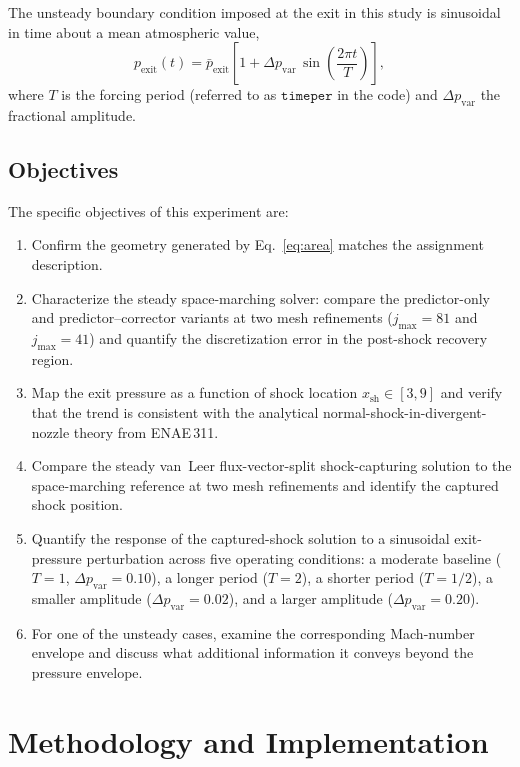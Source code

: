 The unsteady boundary condition imposed at the exit in this study is sinusoidal in time about a mean atmospheric value,
\begin{equation}
    p_{\text{exit}}(t) = \bar{p}_\text{exit}\!\left[1 + \Delta p_\text{var}\, \sin\!\left(\frac{2\pi t}{T}\right)\right],
\end{equation}
where \(T\) is the forcing period (referred to as \(\texttt{timeper}\) in the code) and \(\Delta p_\text{var}\) the fractional amplitude.

\subsection{Objectives} \label{sec:introduction/objectives}

The specific objectives of this experiment are:
\begin{enumerate}
    \item Confirm the geometry generated by Eq.~\eqref{eq:area} matches the assignment description.
    \item Characterize the steady space-marching solver: compare the predictor-only and predictor--corrector variants at two mesh refinements (\(j_\text{max}=81\) and \(j_\text{max}=41\)) and quantify the discretization error in the post-shock recovery region.
    \item Map the exit pressure as a function of shock location \(x_\text{sh} \in [3, 9]\) and verify that the trend is consistent with the analytical normal-shock-in-divergent-nozzle theory from ENAE\,311.
    \item Compare the steady van~Leer flux-vector-split shock-capturing solution to the space-marching reference at two mesh refinements and identify the captured shock position.
    \item Quantify the response of the captured-shock solution to a sinusoidal exit-pressure perturbation across five operating conditions: a moderate baseline (\(T=1\), \(\Delta p_\text{var}=0.10\)), a longer period (\(T=2\)), a shorter period (\(T=1/2\)), a smaller amplitude (\(\Delta p_\text{var}=0.02\)), and a larger amplitude (\(\Delta p_\text{var}=0.20\)).
    \item For one of the unsteady cases, examine the corresponding Mach-number envelope and discuss what additional information it conveys beyond the pressure envelope.
\end{enumerate}

\section{Methodology and Implementation} \label{sec:methodology}

